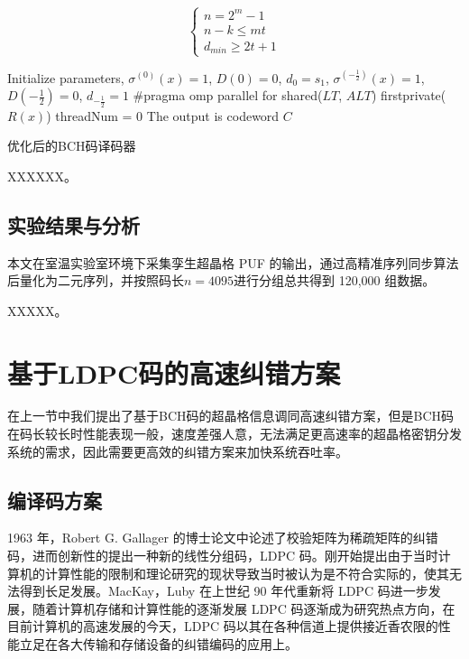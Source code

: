 \begin{equation}
	\left\{
	\begin{split}
		n=2^m-1 \\
		n-k \leq mt \\
		d_{min}\geq 2t+1
	\end{split}
	\right.
	\label{eq4-1}
\end{equation}


\begin{algorithm}[H]
	Initialize parameters, $\sigma^{(0)}(x)=1$, $D(0)=0$, $d_0=s_1$, $\sigma^{(-\frac{1}{2})}(x)=1$, $D(-\frac{1}{2})=0$, $d_{-\frac{1}{2}}=1$\;
	$\#$pragma omp parallel for shared($LT$, $ALT$) firstprivate($R(x)$)\;
	threadNum = 0\;
	The output is codeword $C$\;
	\caption{优化后的BCH码译码器}
	\label{alg4-1}
\end{algorithm}

XXXXXX。

\subsection{实验结果与分析}

本文在室温实验室环境下采集孪生超晶格 PUF 的输出，通过高精准序列同步算法后量化为二元序列，并按照码长$n=4095$进行分组总共得到 120,000 组数据。


XXXXX。

\section{基于LDPC码的高速纠错方案}

在上一节中我们提出了基于BCH码的超晶格信息调同高速纠错方案，但是BCH码在码长较长时性能表现一般，速度差强人意，无法满足更高速率的超晶格密钥分发系统的需求，因此需要更高效的纠错方案来加快系统吞吐率。

\subsection{编译码方案}
1963 年，Robert G. Gallager 的博士论文中论述了校验矩阵为稀疏矩阵的纠错码，进而创新性的提出一种新的线性分组码，LDPC 码。刚开始提出由于当时计算机的计算性能的限制和理论研究的现状导致当时被认为是不符合实际的，使其无法得到长足发展。MacKay，Luby 在上世纪 90 年代重新将 LDPC 码进一步发展\cite{mackay1996near}，随着计算机存储和计算性能的逐渐发展 LDPC 码逐渐成为研究热点方向，在目前计算机的高速发展的今天，LDPC 码以其在各种信道上提供接近香农限的性能立足在各大传输和存储设备的纠错编码的应用上。

